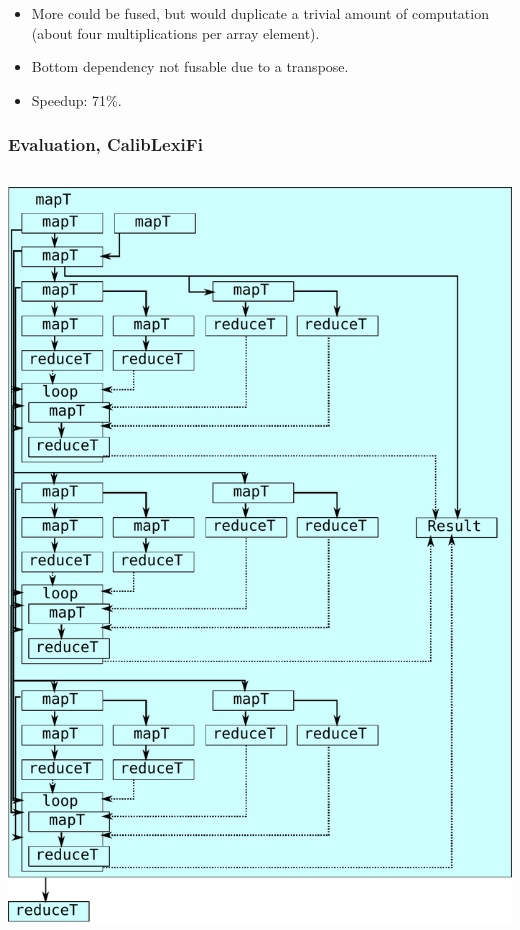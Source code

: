 \documentclass[rgb,dvipsnames]{beamer}
\begin{document}
\begin{frame}
\begin{itemize}
\item More could be fused, but would duplicate a trivial amount of
  computation (about four multiplications per array element).
\item Bottom dependency not fusable due to a transpose.
\item Speedup: 71\%.
\end{itemize}

\end{frame}

\begin{frame}
  \frametitle{Evaluation, CalibLexiFi}

\begin{columns}
\begin{column}{0.4\textwidth}
  \includegraphics[width=\textwidth]{img/CalibLexiFi-unfused.pdf}

\end{column}
\end{columns}
\end{frame}
\end{document}

